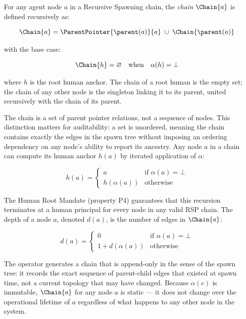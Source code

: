 \begin{dfn}
\label{dfn:rs-accountability-chain}
For any agent node $a$ in a Recursive Spawning chain, the \emph{chain} $\Chain{a}$ is defined recursively as:

\begin{equation}
\Chain{a} = \ParentPointer{\parent(a)}{a} \;\cup\; \Chain{\parent(a)}
\label{eq:rs-chain-recursive}
\end{equation}

with the base case:

\begin{equation}
\Chain{h} = \varnothing \quad \text{when} \quad \alpha(h) = \bot
\label{eq:rs-chain-base}
\end{equation}

where $h$ is the root human anchor. The chain of a root human is the empty set; the chain of any other node is the singleton linking it to its parent, united recursively with the chain of its parent.
\end{dfn}

The chain is a set of parent pointer relations, not a sequence of nodes. This distinction matters for auditability: a set is unordered, meaning the chain contains exactly the edges in the spawn tree without imposing an ordering dependency on any node's ability to report its ancestry. Any node $a$ in a chain can compute its human anchor $h(a)$ by iterated application of $\alpha$:

\begin{equation}
h(a) = 
\begin{cases}
a & \text{if } \alpha(a) = \bot \\
h(\alpha(a)) & \text{otherwise}
\end{cases}
\label{eq:rs-human-anchor}
\end{equation}

The Human Root Mandate (property P4) guarantees that this recursion terminates at a human principal for every node in any valid RSP chain. The depth of a node $a$, denoted $d(a)$, is the number of edges in $\Chain{a}$:

\begin{equation}
d(a) = 
\begin{cases}
0 & \text{if } \alpha(a) = \bot \\
1 + d(\alpha(a)) & \text{otherwise}
\end{cases}
\label{eq:rs-node-depth}
\end{equation}

The \Chain{} operator generates a chain that is append-only in the sense of the spawn tree: it records the exact sequence of parent-child edges that existed at spawn time, not a current topology that may have changed. Because $\alpha(c)$ is immutable, $\Chain{a}$ for any node $a$ is static --- it does not change over the operational lifetime of $a$ regardless of what happens to any other node in the system.

